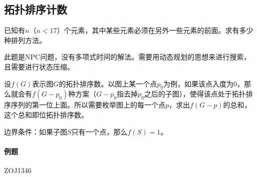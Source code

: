 

\subsection{拓扑排序计数}

已知有$n$（$n<17$）个元素，其中某些元素必须在另外一些元素的前面。求有多少种排列方法。

此题是NPC问题，没有多项式时间的解法。需要用动态规划的思想来进行搜索，且需要进行状态压缩。

设$f(G)$表示图$G$的拓扑排序数。以图上某一个点$p_0$为例，如果该点入度为0，那么就会有$f({G - p_0})$种方案（${G - p_0}$指去掉$p_0$之后的子图），使得该点处于拓扑排序序列的第一位上面。所以需要枚举图上的每一个点$p$，求出$f(G - p)$的总和，这个总和即位拓扑排序数。

边界条件：如果子图$S$只有一个点，那么$f(S) = 1$。

\paragraph{例题} ZOJ1346


